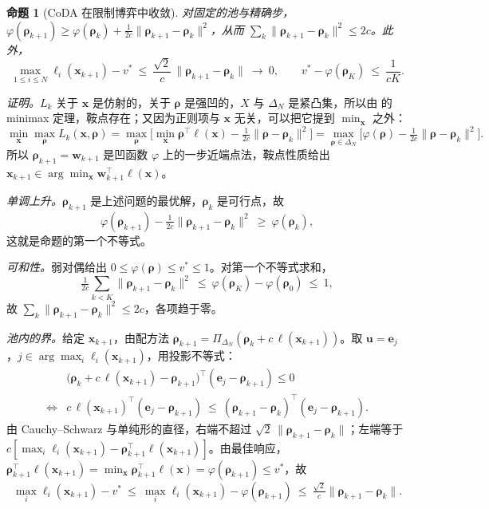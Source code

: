 \documentclass{article}
\theoremstyle{plain}
\newtheorem{proposition}[theorem]{命题}
\theoremstyle{remark}
\newcommand{\Proj}{\Pi}
\newcommand{\simplex}{\Delta}
\newcommand{\bx}{{\bm{x}}}
\newcommand{\bw}{{\bm{w}}}
\newcommand{\bu}{{\bm{u}}}
\newcommand{\be}{{\bm{e}}}
\newcommand{\brho}{{\bm{\rho}}}
\newcommand{\bell}{{\bm{\ell}}}
\newcommand{\coda}{CoDA}
\begin{document}
\begin{proposition}[\coda{} 在限制博弈中收敛]
\label{prop:coda}
对固定的池与精确步，$\varphi(\brho_{k+1})\ge\varphi(\brho_k)+\tfrac1{2c}\|\brho_{k+1}-\brho_k\|^2$，从而 $\sum_k\|\brho_{k+1}-\brho_k\|^2\le2c$。此外，
\[
\max_{1\le i\le N}\ell_i(\bx_{k+1})-v^*\ \le\ \frac{\sqrt2}{c}\,\|\brho_{k+1}-\brho_k\|\ \longrightarrow\ 0 ,\qquad v^*-\varphi(\brho_K)\ \le\ \frac{1}{cK} .
\]
\end{proposition}
\textit{证明。}$L_k$ 关于 $\bx$ 是仿射的，关于 $\brho$ 是强凹的，$X$ 与 $\simplex_N$ 是紧凸集，所以由 \citet{sion1958} 的 minimax 定理，鞍点存在；又因为正则项与 $\bx$ 无关，可以把它提到 $\min_\bx$ 之外：
\[
\min_{\bx}\max_{\brho}L_k(\bx,\brho)=\max_{\brho}\Big[\min_\bx\brho^\top\bell(\bx)-\tfrac1{2c}\|\brho-\brho_k\|^2\Big]=\max_{\brho\in\simplex_N}\Big[\varphi(\brho)-\tfrac1{2c}\|\brho-\brho_k\|^2\Big].
\]
所以 $\brho_{k+1}=\bw_{k+1}$ 是凹函数 $\varphi$ 上的一步近端点法，鞍点性质给出 $\bx_{k+1}\in\arg\min_\bx\bw_{k+1}^\top\bell(\bx)$。

\textit{单调上升。}$\brho_{k+1}$ 是上述问题的最优解，$\brho_k$ 是可行点，故
\[
\varphi(\brho_{k+1})-\tfrac1{2c}\|\brho_{k+1}-\brho_k\|^2\ \ge\ \varphi(\brho_k) ,
\]
这就是命题的第一个不等式。

\textit{可和性。}弱对偶给出 $0\le\varphi(\brho)\le v^*\le1$。对第一个不等式求和，
\[
\tfrac1{2c}\sum_{k<K}\|\brho_{k+1}-\brho_k\|^2\ \le\ \varphi(\brho_K)-\varphi(\brho_0)\ \le\ 1 ,
\]
故 $\sum_k\|\brho_{k+1}-\brho_k\|^2\le2c$，各项趋于零。

\textit{池内的界。}给定 $\bx_{k+1}$，由配方法 $\brho_{k+1}=\Proj_{\simplex_N}(\brho_k+c\,\bell(\bx_{k+1}))$。取 $\bu=\be_j$，$j\in\arg\max_i\ell_i(\bx_{k+1})$，用投影不等式：
\begin{align*}
&\big(\brho_k+c\,\bell(\bx_{k+1})-\brho_{k+1}\big)^\top(\be_j-\brho_{k+1})\le0\\
\iff{}&
c\,\bell(\bx_{k+1})^\top(\be_j-\brho_{k+1})\ \le\ (\brho_{k+1}-\brho_k)^\top(\be_j-\brho_{k+1}) .
\end{align*}
由 Cauchy--Schwarz 与单纯形的直径，右端不超过 $\sqrt2\,\|\brho_{k+1}-\brho_k\|$；左端等于 $c[\max_i\ell_i(\bx_{k+1})-\brho_{k+1}^\top\bell(\bx_{k+1})]$。由最佳响应，$\brho_{k+1}^\top\bell(\bx_{k+1})=\min_\bx\brho_{k+1}^\top\bell(\bx)=\varphi(\brho_{k+1})\le v^*$，故
\[
\max_i\ell_i(\bx_{k+1})-v^*\ \le\ \max_i\ell_i(\bx_{k+1})-\varphi(\brho_{k+1})\ \le\ \tfrac{\sqrt2}{c}\|\brho_{k+1}-\brho_k\| .
\]
\end{document}
